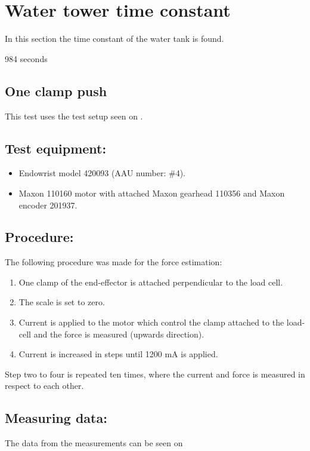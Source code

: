 \section{Water tower time constant}
\label{sec:WT_TimeConstant}

In this section the time constant of the water tank is found.


984 seconds

\subsection{One clamp push} %
This test uses the test setup seen on .

\subsection*{Test equipment:}
\begin{itemize}
\item Endowrist model 420093 (AAU number: \#4).
\item Maxon 110160 motor with attached Maxon gearhead 110356 and Maxon encoder 201937.

\end{itemize}

\subsection*{Procedure:}
The following procedure was made for the force estimation:
\begin{enumerate}
\item One clamp of the end-effector is attached perpendicular to the load cell. 
\item The scale is set to zero.
\item Current is applied to the motor which control the clamp attached to the load-cell and the force is measured (upwards direction).
\item Current is increased in steps until 1200 mA is applied.
\end{enumerate}
Step two to four is repeated ten times, where the current and force is measured in respect to each other. 


\subsection*{Measuring data:}
The data from the measurements can be seen on %

